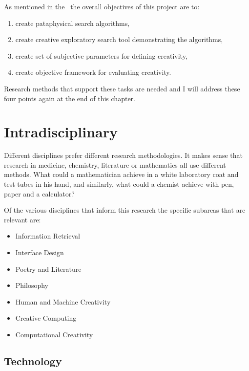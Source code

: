 
As mentioned in the~ the overall objectives of this project are to:

\label{s:objectives}
\begin{enumerate}
  \item create pataphysical search algorithms,
  \item create creative exploratory search tool demonstrating the algorithms,
  \item create set of subjective parameters for defining creativity,
  \item create objective framework for evaluating creativity.
\end{enumerate}

Research methods that support these tasks are needed and I will address these four points again at the end of this chapter.


\section{Intradisciplinary}

Different disciplines prefer different research methodologies. It makes sense that research in medicine, chemistry, literature or mathematics all use different methods. What could a mathematician achieve in a white laboratory coat and test tubes in his hand, and similarly, what could a chemist achieve with pen, paper and a calculator?

Of the various disciplines that inform this research the specific subareas that are relevant are:

\begin{itemize}
  \item Information Retrieval
  \item Interface Design
  \item Poetry and Literature
  \item Philosophy
  \item Human and Machine Creativity
  \item Creative Computing
  \item Computational Creativity
\end{itemize}


\subsection{Technology}

